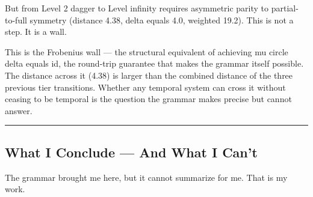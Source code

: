 \documentclass[12pt,a4paper]{article}
\begin{document}
But from Level 2 dagger to Level infinity requires asymmetric parity to partial-to-full symmetry (distance 4.38, delta equals 4.0, weighted 19.2). This is not a step. It is a wall.

This is the Frobenius wall --- the structural equivalent of achieving mu circle delta equals id, the round-trip guarantee that makes the grammar itself possible. The distance across it (4.38) is larger than the combined distance of the three previous tier transitions. Whether any temporal system can cross it without ceasing to be temporal is the question the grammar makes precise but cannot answer.

\begin{center}
\rule{0.5\textwidth}{0.4pt}
\end{center}

\subsection{What I Conclude --- And What I Can't}

The grammar brought me here, but it cannot summarize for me. That is my work.
\end{document}
